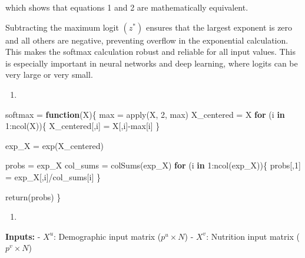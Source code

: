 \documentclass[
]{article}
\newenvironment{Shaded}{\begin{snugshade}}{\end{snugshade}}
\newcommand{\ControlFlowTok}[1]{\textcolor[rgb]{0.99,0.74,0.29}{\textbf{#1}}}
\newcommand{\DecValTok}[1]{\textcolor[rgb]{0.96,0.45,0.00}{#1}}
\newcommand{\FunctionTok}[1]{\textcolor[rgb]{0.56,0.27,0.68}{#1}}
\newcommand{\NormalTok}[1]{\textcolor[rgb]{0.81,0.81,0.76}{#1}}
\newcommand{\OtherTok}[1]{\textcolor[rgb]{0.15,0.68,0.38}{#1}}
\newcommand{\SpecialCharTok}[1]{\textcolor[rgb]{0.24,0.68,0.91}{#1}}
\providecommand{\tightlist}{%
  \setlength{\itemsep}{0pt}\setlength{\parskip}{0pt}}
\begin{document}
which shows that equations 1 and 2 are mathematically equivalent.

\vspace{0.2cm}

Subtracting the maximum logit \((z^*)\) ensures that the largest
exponent is zero and all others are negative, preventing overflow in the
exponential calculation. This makes the softmax calculation robust and
reliable for all input values. This is especially important in neural
networks and deep learning, where logits can be very large or very
small.

\begin{enumerate}
\def\labelenumi{\alph{enumi}.}
\setcounter{enumi}{2}
\tightlist
\item
\end{enumerate}

\begin{Shaded}
\begin{Highlighting}[]
\NormalTok{softmax }\OtherTok{=} \ControlFlowTok{function}\NormalTok{(X)\{}
\NormalTok{ max }\OtherTok{=} \FunctionTok{apply}\NormalTok{(X, }\DecValTok{2}\NormalTok{, max)}
\NormalTok{ X\_centered }\OtherTok{=}\NormalTok{ X}
 \ControlFlowTok{for}\NormalTok{ (i }\ControlFlowTok{in} \DecValTok{1}\SpecialCharTok{:}\FunctionTok{ncol}\NormalTok{(X))\{}
\NormalTok{   X\_centered[,i] }\OtherTok{=}\NormalTok{ X[,i]}\SpecialCharTok{{-}}\NormalTok{max[i]}
\NormalTok{ \}}
 
\NormalTok{ exp\_X }\OtherTok{=} \FunctionTok{exp}\NormalTok{(X\_centered)}
 
\NormalTok{ probs }\OtherTok{=}\NormalTok{ exp\_X}
\NormalTok{ col\_sums }\OtherTok{=} \FunctionTok{colSums}\NormalTok{(exp\_X)}
 \ControlFlowTok{for}\NormalTok{ (i }\ControlFlowTok{in} \DecValTok{1}\SpecialCharTok{:}\FunctionTok{ncol}\NormalTok{(exp\_X))\{}
\NormalTok{   probs[,}\DecValTok{1}\NormalTok{] }\OtherTok{=}\NormalTok{ exp\_X[,i]}\SpecialCharTok{/}\NormalTok{col\_sums[i]}
\NormalTok{ \}}
 
 \FunctionTok{return}\NormalTok{(probs)}
\NormalTok{\}}
\end{Highlighting}
\end{Shaded}

\begin{enumerate}
\def\labelenumi{\alph{enumi}.}
\setcounter{enumi}{3}
\tightlist
\item
\end{enumerate}

\textbf{Inputs:} - \(X^u\): Demographic input matrix (\(p^u \times N\))
- \(X^v\): Nutrition input matrix (\(p^v \times N\))
\end{document}
